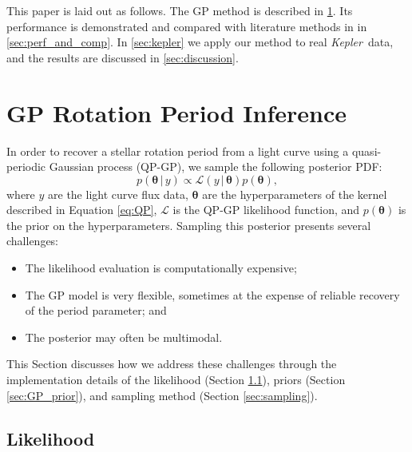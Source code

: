 \documentclass[a4paper,fleqn,usenatbib,useAMS]{mnras}
\newcommand{\Kepler}{{\it Kepler}}
\newcommand{\kepler}{\Kepler}
\begin{document}
This paper is laid out as follows.
The GP method is described in \textsection \ref{sec:method}.
Its performance is demonstrated and compared with literature methods in
in \textsection \ref{sec:perf_and_comp}.
In \textsection \ref{sec:kepler} we apply our method to real \kepler\ data,
and the results are discussed in \textsection \ref{sec:discussion}.

\section{GP Rotation Period Inference}
\label{sec:method}

In order to recover a stellar rotation period from a light curve using a
quasi-periodic Gaussian process (QP-GP), we sample the following posterior
PDF:
\begin{equation}
\label{eq:posterior}
p({\bm \theta}\,|\,y) \propto \mathcal L(y\,|\,{\bm \theta}) p({\bm \theta}),
\end{equation}
where $y$ are the light curve flux data, $\bm \theta$ are the hyperparameters
of the kernel described in Equation \ref{eq:QP}, $\mathcal L$ is the
QP-GP likelihood function, and $p({\bm \theta})$ is the prior on the
hyperparameters.  Sampling this posterior presents several challenges:
\begin{itemize}
    \item The likelihood evaluation is computationally expensive;
    \item The GP model is very flexible, sometimes at the expense of
    reliable recovery of the period parameter; and
    \item The posterior may often be multimodal.
\end{itemize}
This Section discusses how we address these challenges through
the implementation details of the likelihood (Section \ref{sec:GP_lhood}), priors
(Section \ref{sec:GP_prior}), and sampling method (Section \ref{sec:sampling}).

\subsection{Likelihood}
\label{sec:GP_lhood}
\end{document}
